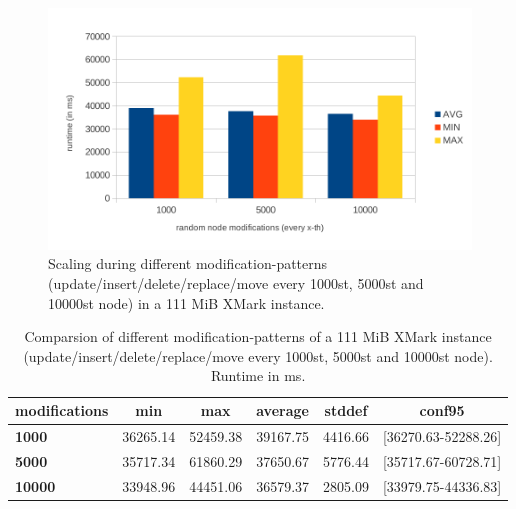 \begin{figure}[tb]
\centering
\includegraphics[width=\textwidth]{figures/100MB-scaling}
\caption{Scaling during different modification-patterns (update/insert/delete/replace/move every 1000st, 5000st and 10000st node) in a 111 MiB XMark instance.} 
\label{fig:100MBscaling}
\end{figure}

\begin{table}[tb]
\centering 
\begin{tabular}[r]{|l|c|c|c|c|c|} 
\hline
\textbf{modifications} & \textbf{min} & \textbf{max} & \textbf{average} & \textbf{stddef} & \textbf{conf95}\\
\hline
\hline
\textbf{1000} & 36265.14 & 52459.38 & 39167.75 & 4416.66 & [36270.63-52288.26]\\
\hline
\textbf{5000} & 35717.34 & 61860.29 & 37650.67 & 5776.44 & [35717.67-60728.71]\\
\hline
\textbf{10000} & 33948.96 & 44451.06 & 36579.37 & 2805.09 & [33979.75-44336.83]\\
\hline
\end{tabular}
\label{chap3:comparsion}
\vspace{0.5em} 
\caption{Comparsion of different modification-patterns of a 111 MiB XMark instance (update/insert/delete/replace/move every 1000st, 5000st and 10000st node). Runtime in ms.}
\end{table}



